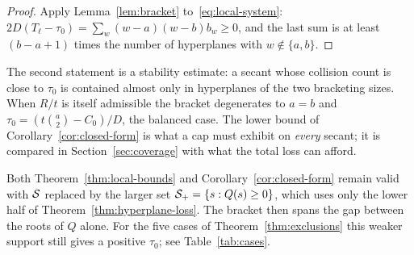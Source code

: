 \begin{proof}
Apply Lemma~\ref{lem:bracket} to~\eqref{eq:local-system}:
\(2D(T_\ell-\tau_0)=\sum_w(w-a)(w-b)b_w\ge0\), and the last sum is at
least \((b-a+1)\) times the number of hyperplanes with \(w\notin\{a,b\}\).
\end{proof}

The second statement is a stability estimate: a secant whose collision
count is close to \(\tau_0\) is contained almost only in hyperplanes of
the two bracketing sizes.  When \(R/t\) is itself admissible the bracket
degenerates to \(a=b\) and \(\tau_0=(t\binom{a}{2}-C_0)/D\), the balanced
case.  The lower bound of Corollary~\ref{cor:closed-form} is what a cap
must exhibit on \emph{every} secant; it is compared in
Section~\ref{sec:coverage} with what the total loss can afford.

\begin{remark}
\label{rem:one-sided}
Both Theorem~\ref{thm:local-bounds} and Corollary~\ref{cor:closed-form}
remain valid with \(\mathcal S\) replaced by the larger set
\(\mathcal S_+=\{s:Q(s)\ge0\}\), which uses only the lower half of
Theorem~\ref{thm:hyperplane-loss}.  The bracket then spans the gap
between the roots of \(Q\) alone.  For the five cases of
Theorem~\ref{thm:exclusions} this weaker support still gives a positive
\(\tau_0\); see Table~\ref{tab:cases}.
\end{remark}
